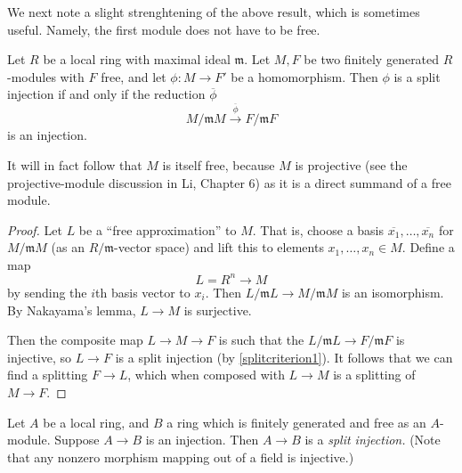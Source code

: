 We next note  a slight strenghtening of the above result, which is sometimes
useful. Namely, the first module does not have to be free.
\begin{proposition} 
Let $R$ be a local ring with maximal ideal $\mathfrak{m}$. Let $M, F$ be two
finitely generated $R$-modules with $F$ free, and let $\phi: M \to F'$ be a homomorphism. 
Then $\phi$ is a split injection if and only if the reduction $\overline{\phi}$
\[ M/\mathfrak{m}M \stackrel{\overline{\phi}}{\to} F/\mathfrak{m}F  \]
is an injection. 
\end{proposition}
It will in fact follow that $M$ is itself free, because $M$ is projective (see
the projective-module discussion in Li, Chapter 6) as it is a direct summand of a free module.
\begin{proof} 
Let $L$ be a ``free approximation'' to $M$.
That is, choose a basis $\overline{x_1}, \dots, \overline{x_n}$ for $M/\mathfrak{m}M$ (as an $R/\mathfrak{m}$-vector
space) and lift this to elements $x_1, \dots, x_n \in M$. Define a map
\[ L = R^n \to M  \]
by sending the $i$th basis vector to $x_i$.
Then $L/\mathfrak{m} L \to M/\mathfrak{m}M$ is an isomorphism.
By Nakayama's lemma,
$L \to M$ is surjective.

Then the composite map
$L \to M \to F$ is such that the $L/\mathfrak{m}L \to F/\mathfrak{m}F$ is injective, so
$L \to F$ is a split injection (by \cref{splitcriterion1}).
It follows that we can find a splitting $F \to L$, which when composed with $L
\to M$ is a splitting of $M \to F$.
\end{proof} 

\begin{exercise} 
Let $A$ be a local ring, and $B$ a ring which is finitely generated and free as an
$A$-module. Suppose $A \to B$ is an injection. Then $A \to B$ is a \emph{split
injection.} (Note that any nonzero morphism mapping out of a field is
injective.) 
\end{exercise} 

